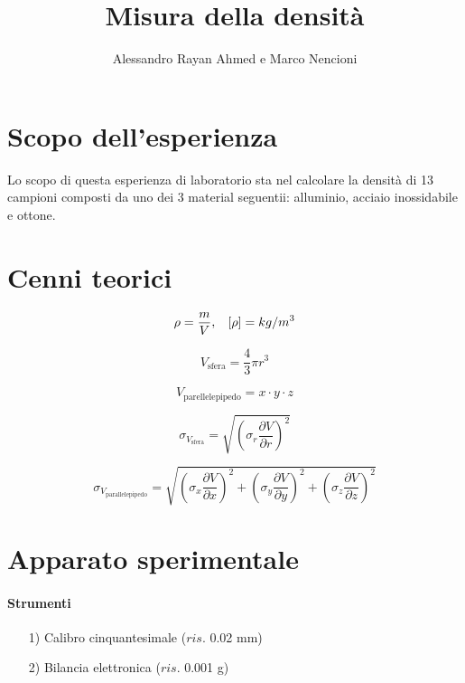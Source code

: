 \documentclass[8pt]{article}
\title{Misura della densità}
\author{Alessandro Rayan Ahmed e Marco Nencioni}
\begin{document}
\maketitle
\pagebreak

\section{Scopo dell'esperienza}
Lo scopo di questa esperienza di laboratorio sta nel calcolare la densità di 13 campioni composti da uno dei 3 material seguentii: alluminio, acciaio inossidabile e ottone.

\section{Cenni teorici}


\begin{displaymath}
	\rho = \frac{m}{V}, \hspace{3mm} [\rho] = kg/m^3
\end{displaymath}

\begin{displaymath}
	V_{\text{sfera}} = \frac{4}{3} \pi r^3
\end{displaymath}

\begin{displaymath}
	V_{\text{parellelepipedo}} = x \cdot y \cdot z
\end{displaymath}

\begin{displaymath}
	\sigma_{V_{\text{sfera}}} = \sqrt{\left(\sigma_{r}\frac{\partial V}{\partial r}\right)^2}
\end{displaymath}

\begin{displaymath}
	\sigma_{V_{\text{parallelepipedo}}} = \sqrt{\left(\sigma_{x}\frac{\partial V}{\partial x}\right)^2 + \left(\sigma_{y}\frac{\partial V}{\partial y}\right)^2 + \left(\sigma_{z}\frac{\partial V}{\partial z}\right)^2}
\end{displaymath}

\pagebreak

\section{Apparato sperimentale}
\paragraph{Strumenti}
\begin{itemize}
\item[1)] Calibro cinquantesimale ($ris.$ 0.02 mm)
\item[2)] Bilancia elettronica ($ris.$ 0.001 g)
\end{itemize}
\end{document}
